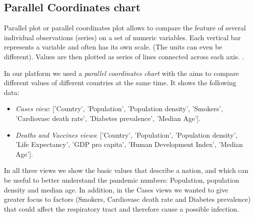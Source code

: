 \documentclass[10pt,conference]{IEEEtran}
\begin{document}
\begin{figure}
\end{figure}

\subsection{Parallel Coordinates chart}
Parallel plot or parallel coordinates plot allows to compare the feature of several individual observations (series) on a set of numeric variables. Each vertical bar represents a variable and often has its own scale. (The units can even be different). Values are then plotted as series of lines connected across each axis. \cite{paral}.

In our platform we used a {\em parallel coordinates chart} with the aims to compare different values of different countries at the same time. 
It shows the following data:
\begin{itemize}
	\item {\em Cases view}: ['Country', 'Population', 'Population density', 'Smokers', 'Cardiovasc death rate', 'Diabetes prevalence', 'Median Age']. 
	\item {\em Deaths and Vaccines views}: ['Country', 'Population', 'Population density', 'Life Expectancy', 'GDP pro capita', 'Human Development Index', 'Median Age']. 
\end{itemize}

In all three views we show the basic values that describe a nation, and which can be useful to better understand the pandemic numbers: Population, population density and median age. In addition, in the Cases views we wanted to give greater focus to factors (Smokers, Cardiovasc death rate and Diabetes prevalence) that could affect the respiratory tract and therefore cause a possible infection.
\end{document}
